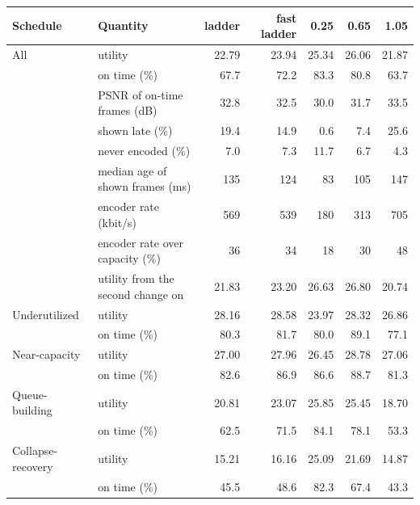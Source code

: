 \begin{tabular}{llrrrrr}
\toprule
Schedule & Quantity & ladder & fast ladder & 0.25 & 0.65 & 1.05 \\
\midrule
All & utility & 22.79 & 23.94 & 25.34 & 26.06 & 21.87 \\
 & on time (\%) & 67.7 & 72.2 & 83.3 & 80.8 & 63.7 \\
 & PSNR of on-time frames (dB) & 32.8 & 32.5 & 30.0 & 31.7 & 33.5 \\
 & shown late (\%) & 19.4 & 14.9 & 0.6 & 7.4 & 25.6 \\
 & never encoded (\%) & 7.0 & 7.3 & 11.7 & 6.7 & 4.3 \\
 & median age of shown frames (ms) & 135 & 124 & 83 & 105 & 147 \\
 & encoder rate (kbit/s) & 569 & 539 & 180 & 313 & 705 \\
 & encoder rate over capacity (\%) & 36 & 34 & 18 & 30 & 48 \\
 & utility from the second change on & 21.83 & 23.20 & 26.63 & 26.80 & 20.74 \\
\midrule
Underutilized & utility & 28.16 & 28.58 & 23.97 & 28.32 & 26.86 \\
 & on time (\%) & 80.3 & 81.7 & 80.0 & 89.1 & 77.1 \\
Near-capacity & utility & 27.00 & 27.96 & 26.45 & 28.78 & 27.06 \\
 & on time (\%) & 82.6 & 86.9 & 86.6 & 88.7 & 81.3 \\
Queue-building & utility & 20.81 & 23.07 & 25.85 & 25.45 & 18.70 \\
 & on time (\%) & 62.5 & 71.5 & 84.1 & 78.1 & 53.3 \\
Collapse-recovery & utility & 15.21 & 16.16 & 25.09 & 21.69 & 14.87 \\
 & on time (\%) & 45.5 & 48.6 & 82.3 & 67.4 & 43.3 \\
\bottomrule
\end{tabular}
